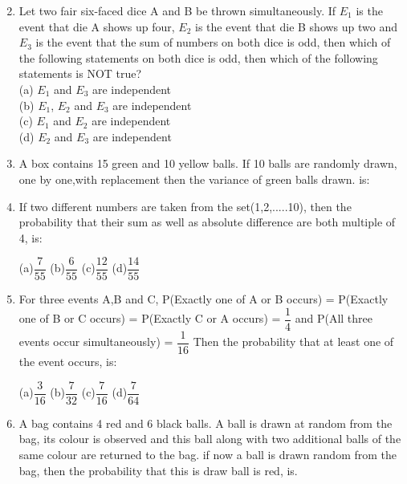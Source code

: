\documentclass[journal,12pt,twocolumn]{IEEEtran}
\begin{document}
\begin{enumerate}[label=\arabic*]
\begin{itemize}
\begin{multicols}{2}
	\end{multicols}
	\end{itemize}
	\item Let two fair six-faced dice A and B be thrown simultaneously. If $E_1$ is the event that die A shows up four, $E_2$ is the event that die B shows up two and $E_3$ is the event that the sum of numbers on both dice is odd, then which of the following statements on both dice is odd, then which of the following statements is NOT true?\\
	(a) $E_1$ and $E_3$ are independent\\
	(b) $E_1$, $E_2$ and $E_3$ are independent\\
	(c) $E_1$ and $E_2$ are independent\\
	(d) $E_2$ and $E_3$ are independent\\
	\item A box contains 15 green and 10 yellow balls. If 10 balls are randomly drawn, one by one,with replacement then the variance of green balls drawn. is:
	\begin{itemize}
	\begin{multicols}{4}
	\item[(a)]$\dfrac{6}{25}$  
	\item[(b)]$\dfrac{12}{5}$  
	\item[(c)]6  
	\item[(d)]4
	\end{multicols}
	\end{itemize}
	\item If two different numbers are taken from the set(1,2,.....10), then the probability that their sum as well as absolute difference are both multiple of 4, is:
	\begin{multicols}{4}
	(a)$\dfrac{7}{55}$  (b)$\dfrac{6}{55}$  (c)$\dfrac{12}{55}$
(d)$\dfrac{14}{55}$
	\end{multicols}
	\item For three events A,B and C, P(Exactly one of A or B occurs) = P(Exactly one of B or C occurs) = P(Exactly C or A occurs) = $\dfrac{1}{4}$ and P(All three events occur simultaneously) = $\dfrac{1}{16}$ Then the probability that at least one of the event occurs, is:
	\begin{multicols}{4}
	(a)$\dfrac{3}{16}$  (b)$\dfrac{7}{32}$  (c)$\dfrac{7}{16}$  (d)$\dfrac{7}{64}$\\
	\end{multicols}
	\item A bag contains 4 red and 6 black balls. A ball is drawn at random from the bag, its colour is observed and this ball along with two additional balls of the same colour are returned to the bag. if now a ball is drawn random from the bag, then the probability that this is draw ball is red, is.\\

\end{enumerate}
\end{document}
